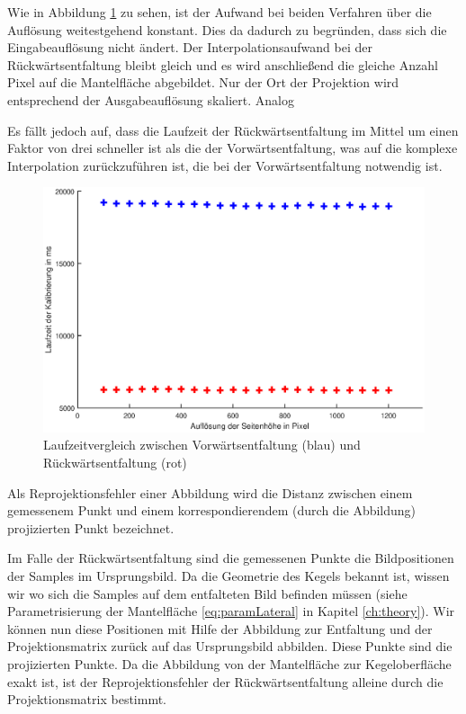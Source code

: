 Wie in Abbildung \ref{fig:runningTimeComparision} zu sehen, ist der Aufwand bei beiden Verfahren über die Auflösung weitestgehend konstant. Dies da dadurch zu begründen, dass sich die Eingabeauflösung nicht ändert. Der Interpolationsaufwand bei der Rückwärtsentfaltung bleibt gleich und es wird anschließend die gleiche Anzahl Pixel auf die Mantelfläche abgebildet. Nur der Ort der Projektion wird entsprechend der Ausgabeauflösung skaliert. Analog 

Es fällt jedoch auf, dass die Laufzeit der Rückwärtsentfaltung im Mittel um einen Faktor von drei schneller ist als die der Vorwärtsentfaltung, was auf die komplexe Interpolation zurückzuführen ist, die bei der Vorwärtsentfaltung notwendig ist. 
\begin{figure}[!htb]
	\centering
	\includegraphics[width=\textwidth]{images/runningTimeCalibration.eps}
	\caption{Laufzeitvergleich zwischen Vorwärtsentfaltung (blau) und Rückwärtsentfaltung (rot)}
	\label{fig:runningTimeComparision}
\end{figure}


\bigskip

Als Reprojektionsfehler einer Abbildung wird die Distanz zwischen einem gemessenem Punkt und einem korrespondierendem (durch die Abbildung) projizierten Punkt bezeichnet. 


Im Falle der Rückwärtsentfaltung sind die gemessenen Punkte die Bildpositionen der Samples im Ursprungsbild. Da die Geometrie des Kegels bekannt ist, wissen wir wo sich die  Samples auf dem entfalteten Bild befinden müssen (siehe Parametrisierung der Mantelfläche \ref{eq:paramLateral} in Kapitel \ref{ch:theory}). Wir können nun diese Positionen mit Hilfe der Abbildung zur Entfaltung und der Projektionsmatrix zurück auf das Ursprungsbild abbilden. Diese Punkte sind die projizierten Punkte. Da die Abbildung von der Mantelfläche zur Kegeloberfläche exakt ist, ist der Reprojektionsfehler der Rückwärtsentfaltung alleine durch die Projektionsmatrix bestimmt. 

